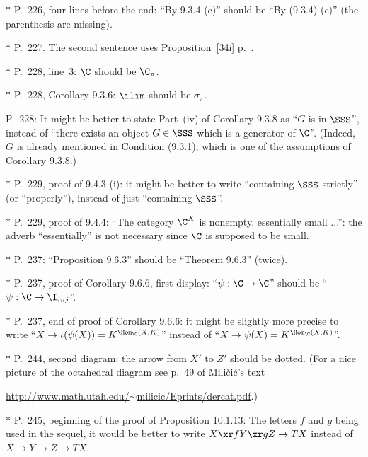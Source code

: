 \documentclass[12pt]{article}
\theoremstyle{remark}
\theoremstyle{definition}
\begin{document}
\nn$*$ P.~226, four lines before the end: ``By 9.3.4 (c)'' should be ``By (9.3.4) (c)'' (the parenthesis are missing).

\nn$*$ P.~227. The second sentence uses Proposition~\ref{34i} p.~.

\nn$*$ P.~228, line~3: $\C$ should be $\C_\pi$.

\nn$*$ P.~228, Corollary 9.3.6: $\ilim$ should be $\sigma_\pi$.

\begin{s}
P.~228: It might be better to state Part~(iv) of Corollary 9.3.8 as ``$G$ is in $\SSS$'', instead of ``there exists an object $G\in\SSS$ which is a generator of $\C$''. (Indeed, $G$ is already mentioned in Condition (9.3.1), which is one of the assumptions of Corollary 9.3.8.)
\end{s}

\nn$*$ P.~229, proof of 9.4.3 (i): it might be better to write ``containing $\SSS$ strictly'' (or ``properly''), instead of just ``containing $\SSS$''. 

\nn$*$ P.~229, proof of 9.4.4: ``The category $\C^X$ is nonempty, essentially small ...'': the adverb ``essentially'' is not necessary since $\C$ is supposed to be small. 


\nn$*$ P.~237: ``Proposition 9.6.3'' should be ``Theorem 9.6.3'' (twice). 

\nn$*$ P.~237, proof of Corollary 9.6.6, first display: ``$\psi:\C\to\C$'' should be ``$\psi:\C\to\I_{inj}$''. 

\nn$*$ P.~237, end of proof of Corollary 9.6.6: it might be slightly more precise to write ``$X\to\iota(\psi(X))=K^{\Hom_\C(X,K)}$'' instead of ``$X\to\psi(X)=K^{\Hom_\C(X,K)}$''.

\nn$*$ P.~244, second diagram: the arrow from $X'$ to $Z'$ should be dotted. (For a nice picture of the octahedral diagram see p.~49 of Mili\v{c}i\'c's text

\href{http://www.math.utah.edu/~milicic/Eprints/dercat.pdf}{http://www.math.utah.edu/$\sim$milicic/Eprints/dercat.pdf}.)

\nn$*$ P.~245, beginning of the proof of Proposition 10.1.13: The letters $f$ and $g$ being used in the sequel, it would be better to write $X\xr fY\xr gZ\to TX$ instead of $X\to Y\to Z\to TX$. 
\end{document}
